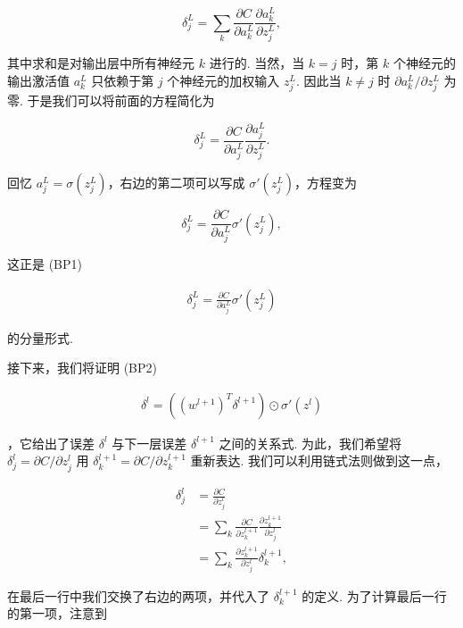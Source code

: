 \begin{equation}
\delta^L_j = \sum_k \frac{\partial C}{\partial a^L_k} \frac{\partial a^L_k}{\partial z^L_j},
\tag{37}
\end{equation}

\noindent 其中求和是对输出层中所有神经元 $k$ 进行的. 当然，当 $k = j$ 时，第 $k$ 个神经元的输出激活值 $a^L_k$ 只依赖于第 $j$ 个神经元的加权输入 $z^L_j$. 因此当 $k \neq j$ 时 $\partial a^L_k / \partial z^L_j$ 为零. 于是我们可以将前面的方程简化为

\begin{equation}
\delta^L_j = \frac{\partial C}{\partial a^L_j} \frac{\partial a^L_j}{\partial z^L_j}.
\tag{38}
\end{equation}

\noindent 回忆 $a^L_j = \sigma(z^L_j)$，右边的第二项可以写成 $\sigma'(z^L_j)$，方程变为

\begin{equation}
\delta^L_j = \frac{\partial C}{\partial a^L_j} \sigma'(z^L_j),
\tag{39}
\end{equation}

\noindent 这正是 (BP1)

\begin{align*}
\delta^L_j = \frac{\partial C}{\partial a^L_j} \sigma'(z^L_j) \nonumber
\end{align*}

\noindent 的分量形式.

接下来，我们将证明 (BP2)

\begin{align*}
\delta^l = ((w^{l+1})^T \delta^{l+1}) \odot \sigma'(z^l) \nonumber
\end{align*}

\noindent，它给出了误差 $\delta^l$ 与下一层误差 $\delta^{l+1}$ 之间的关系式. 为此，我们希望将 $\delta^l_j = \partial C / \partial z^l_j$ 用 $\delta^{l+1}_k = \partial C / \partial z^{l+1}_k$ 重新表达. 我们可以利用链式法则做到这一点，

\begin{align}
\delta^l_j &= \frac{\partial C}{\partial z^l_j} \tag{40} \\ &= \sum_k \frac{\partial C}{\partial z^{l+1}_k} \frac{\partial z^{l+1}_k}{\partial z^l_j} \tag{41} \\ &= \sum_k \frac{\partial z^{l+1}_k}{\partial z^l_j} \delta^{l+1}_k, \tag{42}
\end{align}

\noindent 在最后一行中我们交换了右边的两项，并代入了 $\delta^{l+1}_k$ 的定义. 为了计算最后一行的第一项，注意到


